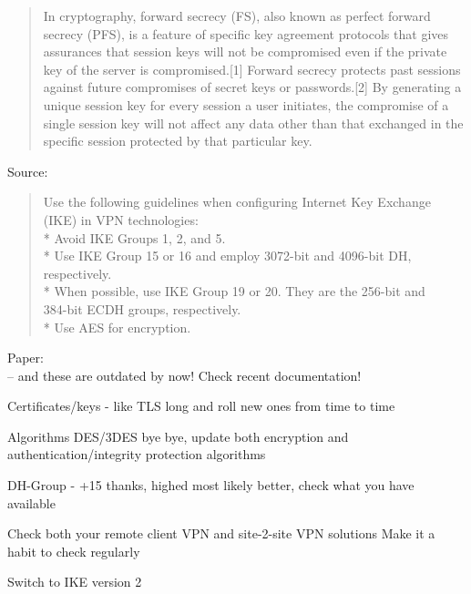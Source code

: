 \documentclass[Screen16to9,17pt]{foils}
\begin{document}
\begin{quote}
In cryptography, forward secrecy (FS), also known as perfect forward secrecy (PFS), is a feature of specific key agreement protocols that gives assurances that session keys will not be compromised even if the private key of the server is compromised.[1] Forward secrecy protects past sessions against future compromises of secret keys or passwords.[2] By generating a unique session key for every session a user initiates, the compromise of a single session key will not affect any data other than that exchanged in the specific session protected by that particular key.
\end{quote}

Source: 




\begin{quote}\footnotesize
  Use the following guidelines when configuring Internet Key Exchange (IKE) in VPN technologies:\\
* Avoid IKE Groups 1, 2, and 5.\\
* Use IKE Group 15 or 16 and employ 3072-bit and 4096-bit DH, respectively.\\
* When possible, use IKE Group 19 or 20. They are the 256-bit and \\
384-bit ECDH groups, respectively.\\
* Use AES for encryption.
\end{quote}
Paper:
{\small {}}\\
-- and these are outdated by now! Check recent documentation!

\begin{list2}
\item Certificates/keys - like TLS long and roll new ones from time to time
\item Algorithms DES/3DES bye bye, update both encryption and authentication/integrity protection algorithms
\item DH-Group - +15 thanks, highed most likely better, check what you have available
\item Check both your remote client VPN and site-2-site VPN solutions Make it a habit to check regularly
\item Switch to IKE version 2
\end{list2}
\end{document}
